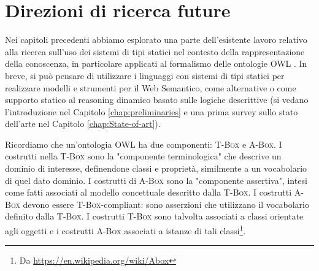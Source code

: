 
\chapter[Direzioni di ricerca future]{Direzioni di ricerca future}
\label{chap:FutureWork}

Nei capitoli precedenti abbiamo esplorato una parte dell'esistente lavoro relativo alla ricerca sull'uso dei sistemi di tipi statici nel contesto della 
rappresentazione della conoscenza, in particolare applicati al formalismo delle ontologie OWL \cite{OWL}. In breve, si può pensare di utilizzare i 
linguaggi con sistemi di tipi statici per realizzare modelli e strumenti per  il Web Semantico, come alternative o come supporto statico al reasoning 
dinamico basato sulle logiche descrittive (si vedano l'introduzione nel Capitolo \ref{chap:preliminaries} e una prima survey sullo stato dell'arte nel Capitolo \ref{chap:State-of-art}).

Ricordiamo che un'ontologia OWL ha due componenti: \textsc{T-Box} e \textsc{A-Box}. I costrutti nella \textsc{T-Box} sono la "componente terminologica" che descrive un dominio di 
interesse, definendone classi e proprietà, similmente a un vocabolario di quel dato dominio. I costrutti di \textsc{A-Box} sono la "componente assertiva", 
intesi come fatti associati al modello concettuale descritto dalla \textsc{T-Box}. I costrutti \textsc{A-Box} devono essere \textsc{T-Box}-compliant: sono asserzioni che utilizzano il 
vocabolario definito dalla \textsc{T-Box}. I costrutti \textsc{T-Box} sono talvolta associati a classi orientate agli oggetti e i costrutti \textsc{A-Box} associati a istanze di tali 
classi\footnote{Da \url{https://en.wikipedia.org/wiki/Abox}}.

